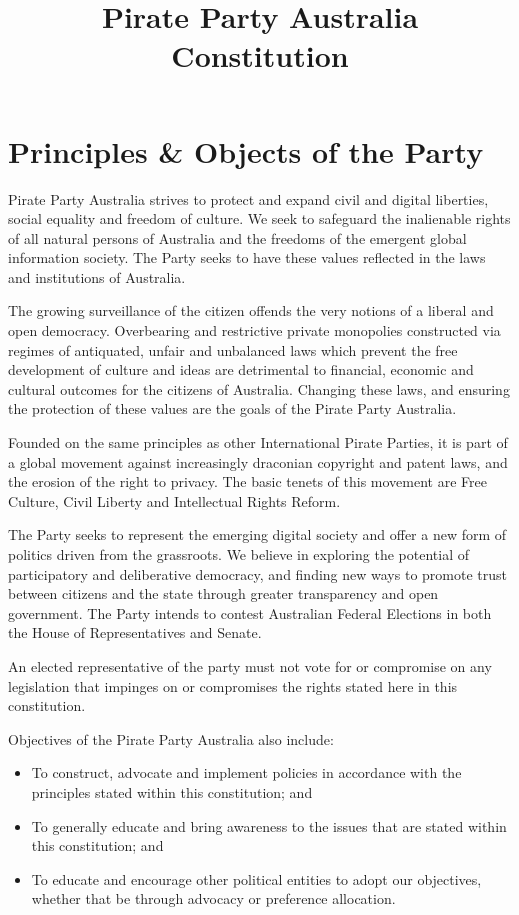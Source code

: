 \documentclass[a4paper,titlepage,8.5pt]{article}
\title{Pirate Party Australia Constitution}
\begin{document}
\tableofcontents
\thispagestyle{empty}
\newpage

\setcounter{page}{1}

\part{Principles \& Objects of the Party}
Pirate Party Australia strives to protect and expand civil and digital liberties, social equality and freedom of culture. We seek to safeguard the inalienable rights of all natural persons of Australia and the freedoms of the emergent global information society. The Party seeks to have these values reflected in the laws and institutions of Australia.

The growing surveillance of the citizen offends the very notions of a liberal and open democracy. Overbearing and restrictive private monopolies constructed via regimes of antiquated, unfair and unbalanced laws which prevent the free development of culture and ideas are detrimental to financial, economic and cultural outcomes for the citizens of Australia. Changing these laws, and ensuring the protection of these values are the goals of the Pirate Party Australia. 

Founded on the same principles as other International Pirate Parties, it is part of a global movement against increasingly draconian copyright and patent laws, and the erosion of the right to privacy. The basic tenets of this movement are Free Culture, Civil Liberty and Intellectual Rights Reform.

The Party seeks to represent the emerging digital society and offer a new form of politics driven from the grassroots. We believe in exploring the potential of participatory and deliberative democracy, and finding new ways to promote trust between citizens and the state through greater transparency and open government. The Party intends to contest Australian Federal Elections in both the House of Representatives and Senate.

An elected representative of the party must not vote for or compromise on any legislation that impinges on or compromises the rights stated here in this constitution.


Objectives of the Pirate Party Australia also include:
\begin{itemize}
\item To construct, advocate and implement policies in accordance with the principles stated within this constitution; and
\item To generally educate and bring awareness to the issues that are stated within this constitution; and
\item To educate and encourage other political entities to adopt our objectives, whether that be through advocacy or preference allocation.
\end{itemize}
\end{document}
